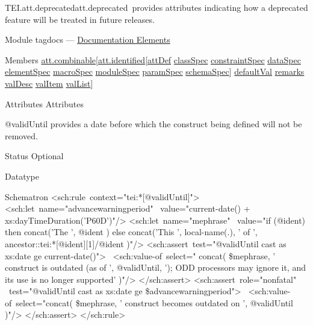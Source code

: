 \begin{reflist}
\item[]\begin{specHead}{TEI.att.deprecated}{att.deprecated} provides attributes indicating how a deprecated feature will be treated in future releases.\end{specHead} 
    \item[{Module}]
  tagdocs — \hyperref[TD]{Documentation Elements}
    \item[{Members}]
  \hyperref[TEI.att.combinable]{att.combinable}[\hyperref[TEI.att.identified]{att.identified}[\hyperref[TEI.attDef]{attDef} \hyperref[TEI.classSpec]{classSpec} \hyperref[TEI.constraintSpec]{constraintSpec} \hyperref[TEI.dataSpec]{dataSpec} \hyperref[TEI.elementSpec]{elementSpec} \hyperref[TEI.macroSpec]{macroSpec} \hyperref[TEI.moduleSpec]{moduleSpec} \hyperref[TEI.paramSpec]{paramSpec} \hyperref[TEI.schemaSpec]{schemaSpec}] \hyperref[TEI.defaultVal]{defaultVal} \hyperref[TEI.remarks]{remarks} \hyperref[TEI.valDesc]{valDesc} \hyperref[TEI.valItem]{valItem} \hyperref[TEI.valList]{valList}]
    \item[{Attributes}]
  Attributes\hfil\\[-10pt]\begin{sansreflist}
    \item[@validUntil]
  provides a date before which the construct being defined will not be removed.
\begin{reflist}
    \item[{Status}]
  Optional
    \item[{Datatype}]
    \item[{Schematron}]
   <sch:rule context="tei:*[@validUntil]"> <sch:let name="advance\textunderscore warning\textunderscore period"  value="current-date() + xs:dayTimeDuration('P60D')"/> <sch:let name="me\textunderscore phrase"  value="if (@ident) then concat('The ', @ident ) else concat('This ', local-name(.),   ' of ', ancestor::tei:*[@ident][1]/@ident )"/> <sch:assert test="@validUntil cast as xs:date ge current-date()">  <sch:value-of select=" concat( \$me\textunderscore phrase, ' construct is outdated (as of ', @validUntil,   '); ODD processors may ignore it, and its use is no longer supported'   )"/> </sch:assert> <sch:assert role="nonfatal"  test="@validUntil cast as xs:date ge \$advance\textunderscore warning\textunderscore period">  <sch:value-of select="concat( \$me\textunderscore phrase, ' construct becomes outdated on ', @validUntil   )"/> </sch:assert> </sch:rule>

\end{reflist}
\end{sansreflist}
\end{reflist}
